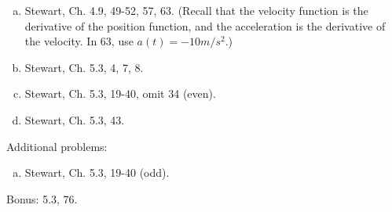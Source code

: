 \documentclass[12pt]{article}
\begin{document}
\begin{enumerate}[(a)]
\item
Stewart, Ch. 4.9, 49-52, 57, 63. (Recall that the velocity function is the derivative
of the position function, and the acceleration is the derivative of the velocity. In 63,
use $a(t) = -10 m/s^2$.)

\item
Stewart, Ch. 5.3, 4, 7, 8.

\item
Stewart, Ch. 5.3, 19-40, omit 34 (even).

\item
Stewart, Ch. 5.3, 43.

\end{enumerate}
Additional problems:
\begin{enumerate}[(a)]

\item
Stewart, Ch. 5.3, 19-40 (odd).
\end{enumerate}
Bonus: 5.3, 76.
\end{document}
